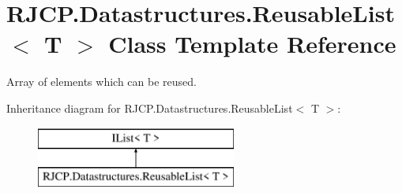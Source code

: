 \hypertarget{class_r_j_c_p_1_1_datastructures_1_1_reusable_list}{}\section{R\+J\+C\+P.\+Datastructures.\+Reusable\+List$<$ T $>$ Class Template Reference}
\label{class_r_j_c_p_1_1_datastructures_1_1_reusable_list}


Array of elements which can be reused.  


Inheritance diagram for R\+J\+C\+P.\+Datastructures.\+Reusable\+List$<$ T $>$\+:\begin{figure}[H]
\begin{center}
\leavevmode
\includegraphics[height=2.000000cm]{class_r_j_c_p_1_1_datastructures_1_1_reusable_list}
\end{center}
\end{figure}
